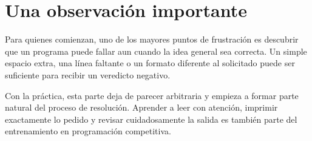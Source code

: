 \section{Una observación importante}

Para quienes comienzan, uno de los mayores puntos de frustración es descubrir que un programa puede fallar aun cuando la idea general sea correcta. Un simple espacio extra, una línea faltante o un formato diferente al solicitado puede ser suficiente para recibir un veredicto negativo.

Con la práctica, esta parte deja de parecer arbitraria y empieza a formar parte natural del proceso de resolución. Aprender a leer con atención, imprimir exactamente lo pedido y revisar cuidadosamente la salida es también parte del entrenamiento en programación competitiva.